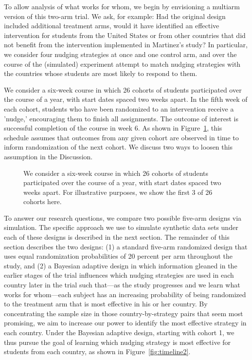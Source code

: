 \documentclass{acm_proc_article-sp}
\begin{document}
To allow analysis of what works for whom, we begin by envisioning a multiarm version of this two-arm trial. 
We ask, for example: Had the original design included additional treatment arms, would it have identified an effective intervention for students from the United States or from other countries that did not benefit from the intervention implemented in Martinez's study? 
In particular, we consider four nudging strategies at once and one control arm, and over the course of the (simulated) experiment attempt to match nudging strategies with the countries whose students are most likely to respond to them.

We consider a six-week course in which 26 cohorts of students participated over the course of a year, with start dates spaced two weeks apart. 
In the fifth week of each cohort, students who have been randomized to an intervention receive a 'nudge,' encouraging them to finish all assignments. 
The outcome of interest is successful completion of the course in week 6. 
As shown in Figure~\ref{fig:timeline}, this schedule assumes that outcomes from any given cohort are observed in time to inform randomization of the next cohort. 
We discuss two ways to loosen this assumption in the Discussion. 

\begin{figure}
\centering
{}
\caption{We consider a six-week course in which 26 cohorts of students participated over the course of a year, with start dates spaced two weeks apart. For illustrative purposes, we show the first 3 of 26 cohorts here.}
\label{fig:timeline}
\end{figure}

To answer our research questions, we compare two possible five-arm designs via simulation. 
The specific approach we use to simulate synthetic data sets under each of these designs is described in the next section. 
The remainder of this section describes the two designs: (1) a standard five-arm randomized design that uses equal randomization probabilities of 20 percent per arm throughout the study, and (2) a Bayesian adaptive design in which information gleaned in the earlier stages of the trial influences which nudging strategies are used in each country later in the trial such that—as the study progresses and we learn what works for whom—each subject has an increasing probability of being randomized to the treatment arm that is most effective in his or her country. 
By concentrating the sample size in those country-by-strategy pairs that seem most promising, we aim to increase our power to identify the most effective strategy in each country. 
Under the Bayesian adaptive design, starting with cohort 1, we thus pursue the goal of learning which nudging strategy is most effective for students from each country, as shown in Figure~\ref{fig:timeline2}. 
\end{document}

